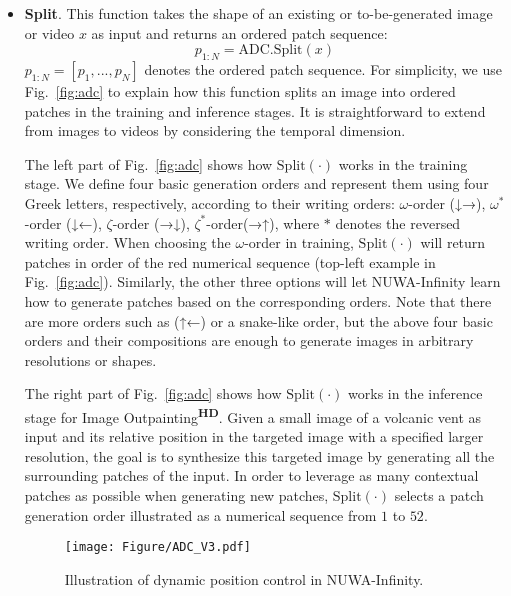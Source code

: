 \documentclass{article}
\begin{document}
\begin{itemize}[leftmargin=*]
\item \textbf{Split}. This function takes the shape of an existing or to-be-generated image or video $x$ as input and returns an ordered patch sequence:
\begin{equation}\label{eq:split}
p_{1:N}=\text{ADC.Split}(x)
\end{equation}
$p_{1:N}=[p_1,...,p_N]$ denotes the ordered patch sequence. For simplicity, we use Fig.~\ref{fig:adc} to explain how this function splits an image into ordered patches in the training and inference stages. It is straightforward to extend from images to videos by considering the temporal dimension.

The left part of Fig.~\ref{fig:adc} shows how $\text{Split}(\cdot)$ works in the training stage. We define four basic generation orders and represent them using four Greek letters, respectively, according to their writing orders: $\omega$-order (↓→), $\omega^*$-order (↓←), $\zeta$-order (→↓), $\zeta^*$-order(→↑), where $*$ denotes the reversed writing order. When choosing the $\omega$-order in training, $\text{Split}(\cdot)$ will return patches in order of the red numerical sequence (top-left example in Fig.~\ref{fig:adc}). Similarly, the other three options will let NUWA-Infinity learn how to generate patches based on the corresponding orders. Note that there are more orders such as (↑←) or a snake-like order, but the above four basic orders and their compositions are enough to generate images in arbitrary resolutions or shapes.

The right part of Fig.~\ref{fig:adc} shows how $\text{Split}(\cdot)$ works in the inference stage for Image Outpainting\textsuperscript{\textbf{HD}}. Given a small image of a volcanic vent as input and its relative position in the targeted image with a specified larger resolution, the goal is to synthesize this targeted image by generating all the surrounding patches of the input. In order to leverage as many contextual patches as possible when generating new patches, 
$\text{Split}(\cdot)$ selects a patch generation order illustrated as a numerical sequence from $1$ to $52$. 



\begin{figure}[t!]
    \centering
    \texttt{[image: Figure/ADC\_V3.pdf]}
    \caption{Illustration of dynamic position control in NUWA-Infinity. 
}
    \label{fig:pos}
\end{figure}


\end{itemize}
\end{document}
